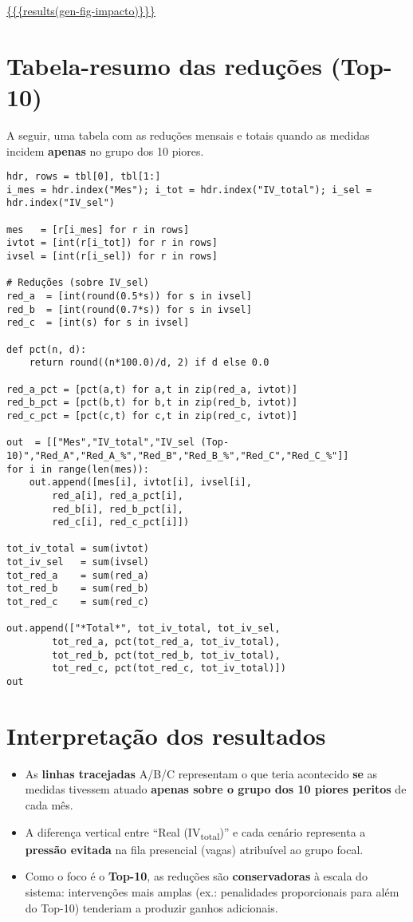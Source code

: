\documentclass[11pt]{article}
\begin{document}
\url{\{\{\{results(gen-fig-impacto)\}\}\}}

\section{Tabela-resumo das reduções (Top-10)}
\label{sec:org54aed66}
A seguir, uma tabela com as reduções mensais e totais quando as medidas incidem \textbf{apenas} no grupo dos 10 piores.

\begin{verbatim}
hdr, rows = tbl[0], tbl[1:]
i_mes = hdr.index("Mes"); i_tot = hdr.index("IV_total"); i_sel = hdr.index("IV_sel")

mes   = [r[i_mes] for r in rows]
ivtot = [int(r[i_tot]) for r in rows]
ivsel = [int(r[i_sel]) for r in rows]

# Reduções (sobre IV_sel)
red_a  = [int(round(0.5*s)) for s in ivsel]
red_b  = [int(round(0.7*s)) for s in ivsel]
red_c  = [int(s) for s in ivsel]

def pct(n, d):
    return round((n*100.0)/d, 2) if d else 0.0

red_a_pct = [pct(a,t) for a,t in zip(red_a, ivtot)]
red_b_pct = [pct(b,t) for b,t in zip(red_b, ivtot)]
red_c_pct = [pct(c,t) for c,t in zip(red_c, ivtot)]

out  = [["Mes","IV_total","IV_sel (Top-10)","Red_A","Red_A_%","Red_B","Red_B_%","Red_C","Red_C_%"]]
for i in range(len(mes)):
    out.append([mes[i], ivtot[i], ivsel[i],
		red_a[i], red_a_pct[i],
		red_b[i], red_b_pct[i],
		red_c[i], red_c_pct[i]])

tot_iv_total = sum(ivtot)
tot_iv_sel   = sum(ivsel)
tot_red_a    = sum(red_a)
tot_red_b    = sum(red_b)
tot_red_c    = sum(red_c)

out.append(["*Total*", tot_iv_total, tot_iv_sel,
	    tot_red_a, pct(tot_red_a, tot_iv_total),
	    tot_red_b, pct(tot_red_b, tot_iv_total),
	    tot_red_c, pct(tot_red_c, tot_iv_total)])
out
\end{verbatim}

\section{Interpretação dos resultados}
\label{sec:org9028857}
\begin{itemize}
\item As \textbf{linhas tracejadas} A/B/C representam o que teria acontecido \textbf{\textbf{se}} as medidas tivessem atuado \textbf{apenas sobre o grupo dos 10 piores peritos} de cada mês.
\item A diferença vertical entre “Real (IV\textsubscript{total})” e cada cenário representa a \textbf{pressão evitada} na fila presencial (vagas) atribuível ao grupo focal.
\item Como o foco é o \textbf{Top-10}, as reduções são \textbf{conservadoras} à escala do sistema: intervenções mais amplas (ex.: penalidades proporcionais para além do Top-10) tenderiam a produzir ganhos adicionais.
\end{itemize}
\end{document}

